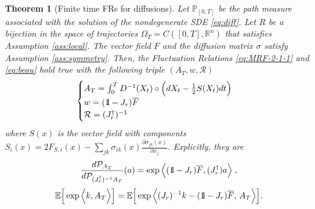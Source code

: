 \documentclass[a4paper,11pt]{article}
\numberwithin{equation}{section}
\newcommand{\bbbone}{\mathchoice {\rm 1\mskip-4mu l} {\rm 1\mskip-4mu l}
{\rm 1\mskip-4.5mu l} {\rm 1\mskip-5mu l}}
\newtheorem{theorem}{Theorem}[section] %
\begin{document}
\begin{theorem}[Finite time FRs for diffusions]
Let $\mathbb{P}_{\left[0,T\right]}$ be the path measure associated with the solution of the nondegenerate SDE \eqref{eq:diff}. Let $R$ be a bijection in the space of trajectories $\Omega_T=C([0,T], \mathbb{R}^n)$ that satisfies Assumption \ref{ass:local}. The vector field $F$ and the diffusion matrix $\sigma$ satisfy Assumption \ref{ass:symmetry}. Then, the Fluctuation Relations \eqref{eq:MRF-2-1-1} and \eqref{eq:beau} hold true with the following triple $(A_T, w, \mathcal{R})$
    $$\begin{cases}
     A_T=\int_{0}^{T}  D^{-1}(X_{t})\circ \Big(dX_{t} - \frac{1}{2} S(X_t) dt \Big) \\
     w = (\bbbone -J_r) \overline{F} \\
     \mathcal{R} = (J_r^\dag)^{-1}
    \end{cases}$$
where $S(x)$ is the vector field with components $ S_i(x)= 2 F_{S,i}(x) - \sum_{jk}\sigma_{ik}(x)\frac{\partial \sigma_{jk}(x)}{\partial x_j}$. Explicitly, they are
\begin{equation}\label{eq:diffFR1}
\frac{d\mathcal{P}_{A_T}}{d\mathcal{P}_{(J_r^\dag)^{-1} A_T}}(a)=\exp \Big\langle (\bbbone -J_r)\overline{F},(J_r^\dag) a \Big\rangle  \; ,
\end{equation}
\begin{equation}\label{eq:diffFR2}
\mathbb{E}\Big[\exp\Big\langle k,A_T\Big\rangle \Big]=\mathbb{E}\Big[\exp \Big\langle (J_r)^{-1} k -
(\bbbone-J_r)\overline{F}, \,A_T\Big\rangle \Big] .
\end{equation}
\end{theorem}
\end{document}
